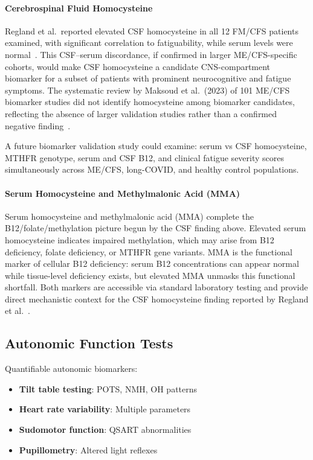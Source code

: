 \paragraph{Cerebrospinal Fluid Homocysteine}
Regland et al.\ reported elevated CSF homocysteine in all 12 FM/CFS patients examined, with
significant correlation to fatiguability, while serum levels were normal~\cite{Regland1997}.
This CSF--serum discordance, if confirmed in larger ME/CFS-specific cohorts, would make CSF
homocysteine a candidate CNS-compartment biomarker for a subset of patients with prominent
neurocognitive and fatigue symptoms. The systematic review by Maksoud et al.\ (2023) of 101
ME/CFS biomarker studies did not identify homocysteine among biomarker candidates, reflecting
the absence of larger validation studies rather than a confirmed negative finding~\cite{Maksoud2023}.

A future biomarker validation study could examine: serum vs CSF homocysteine, MTHFR genotype,
serum and CSF B12, and clinical fatigue severity scores simultaneously across ME/CFS, long-COVID,
and healthy control populations.

\paragraph{Serum Homocysteine and Methylmalonic Acid (MMA)}
Serum homocysteine and methylmalonic acid (MMA) complete the B12/folate/methylation picture begun by the CSF finding above. Elevated serum homocysteine indicates impaired methylation, which may arise from B12 deficiency, folate deficiency, or MTHFR gene variants. MMA is the functional marker of cellular B12 deficiency: serum B12 concentrations can appear normal while tissue-level deficiency exists, but elevated MMA unmasks this functional shortfall. Both markers are accessible via standard laboratory testing and provide direct mechanistic context for the CSF homocysteine finding reported by Regland et al.~\cite{Regland1997}.

\subsection{Autonomic Function Tests}

Quantifiable autonomic biomarkers:
\begin{itemize}
    \item \textbf{Tilt table testing}: POTS, NMH, OH patterns
    \item \textbf{Heart rate variability}: Multiple parameters
    \item \textbf{Sudomotor function}: QSART abnormalities
    \item \textbf{Pupillometry}: Altered light reflexes
\end{itemize}

